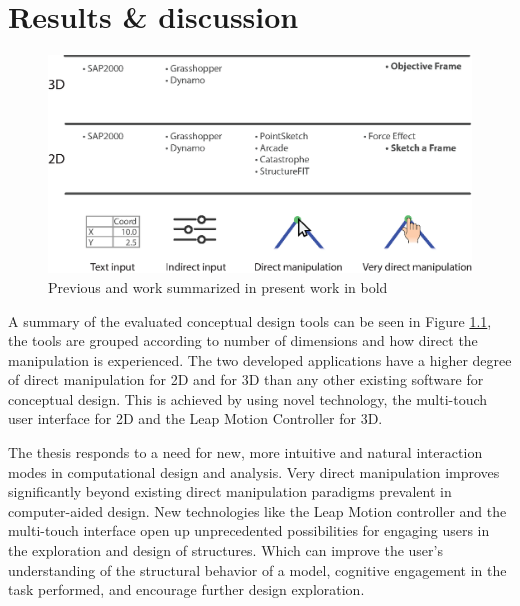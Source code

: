 \chapter{Results \& discussion}
\label{ch:Results discussion}
\begin{figure}
  \includegraphics[width=330pt]{graphics/softwareReview.eps}
  \caption{Previous and work summarized in present work in bold}
  \label{fig:softwareReview}
\end{figure}

A summary of the evaluated conceptual design tools can be seen in Figure \ref{fig:softwareReview}, the tools are grouped according to number of dimensions and how direct the manipulation is experienced. The two developed applications have a higher degree of direct manipulation for 2D and for 3D than any other existing software for conceptual design. This is achieved by using novel technology, the multi-touch user interface for 2D and the Leap Motion Controller for 3D.

The thesis responds to a need for new, more intuitive and natural interaction modes in computational design and analysis. Very direct manipulation improves significantly beyond existing direct manipulation paradigms prevalent in computer-aided design. New technologies like the Leap Motion controller and the multi-touch interface open up unprecedented possibilities for engaging users in the exploration and design of structures. Which can improve the user’s understanding of the structural behavior of a model, cognitive engagement in the task performed, and encourage further design exploration.


